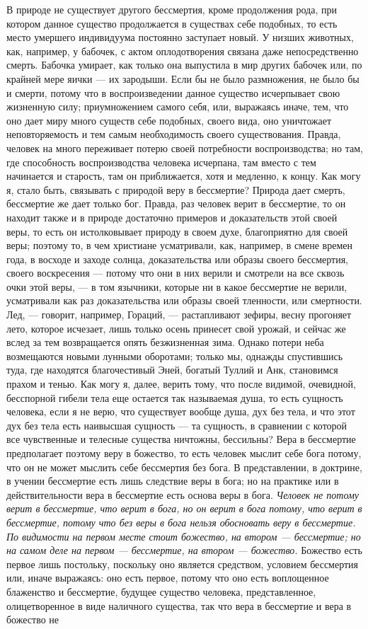 \documentclass[12pt]{article}
\begin{document}
В природе не существует другого бессмертия, кроме продолжения рода, при котором данное существо продолжается в существах себе подобных, то есть место умершего индивидуума постоянно заступает новый. У низших животных, как, например, у бабочек, с актом оплодотворения связана даже непосредственно смерть. Бабочка умирает, как только она выпустила в мир других бабочек или, по крайней мере яички --- их зародыши. Если бы не было размножения, не было бы и смерти, потому что в воспроизведении данное существо исчерпывает свою жизненную силу; приумножением самого себя, или, выражаясь иначе, тем, что оно дает миру много существ себе подобных, своего вида, оно уничтожает неповторяемость и тем самым необходимость своего существования. Правда, человек на много переживает потерю своей потребности воспроизводства; но там, где способность воспроизводства человека исчерпана, там вместо с тем начинается и старость, там он приближается, хотя и медленно, к концу. Как могу я, стало быть, связывать с природой веру в бессмертие? Природа дает смерть, бессмертие же дает только бог. Правда, раз человек верит в бессмертие, то он находит также и в природе достаточно примеров и доказательств этой своей веры, то есть он истолковывает природу в своем духе, благоприятно для своей веры; поэтому то, в чем христиане усматривали, как, например, в смене времен года, в восходе и заходе солнца, доказательства или образы своего бессмертия, своего воскресения --- потому что они в них верили и смотрели на все сквозь очки этой веры, --- в том язычники, которые ни в какое бессмертие не верили, усматривали как раз доказательства или образы своей тленности, или смертности. Лед, --- говорит, например, Гораций, --- растапливают зефиры, весну прогоняет лето, которое исчезает, лишь только осень принесет свой урожай, и сейчас же вслед за тем возвращается опять безжизненная зима. Однако потери неба возмещаются новыми лунными оборотами; только мы, однажды спустившись туда, где находятся благочестивый Эней, богатый Туллий и Анк, становимся прахом и тенью. Как могу я, далее, верить тому, что после видимой, очевидной, бесспорной гибели тела еще остается так называемая душа, то есть сущность человека, если я не верю, что существует вообще душа, дух без тела, и что этот дух без тела есть наивысшая сущность --- та сущность, в сравнении с которой все чувственные и телесные существа ничтожны, бессильны? Вера в бессмертие предполагает поэтому веру в божество, то есть человек мыслит себе бога потому, что он не может мыслить себе бессмертия без бога. В представлении, в доктрине, в учении бессмертие есть лишь следствие веры в бога; но на практике или в действительности вера в бессмертие есть основа веры в бога. \emph{Человек не потому верит в бессмертие, что верит в бога, но он верит в бога потому, что верит в бессмертие, потому что без веры в бога нельзя обосновать веру в бессмертие. По видимости на первом месте стоит божество, на втором --- бессмертие; но на самом деле на первом --- бессмертие, на втором --- божество.} Божество есть первое лишь постольку, поскольку оно является средством, условием бессмертия или, иначе выражаясь: оно есть первое, потому что оно есть воплощенное блаженство и бессмертие, будущее существо человека, представленное, олицетворенное в виде наличного существа, так что вера в бессмертие и вера в божество не 
\end{document}
